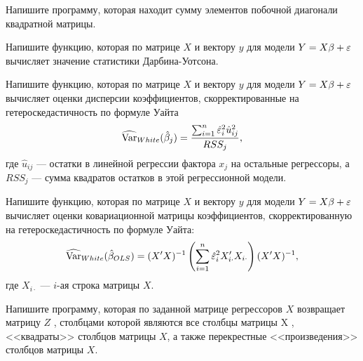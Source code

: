 \documentclass[pdftex,11pt,openany]{book}\usepackage[]{graphicx}\usepackage[]{color}
\begin{document}
\begin{solution}
\end{solution}


\begin{problem}
Напишите программу, которая находит сумму элементов побочной диагонали квадратной матрицы. 
\end{problem}

\begin{solution}
\end{solution}


\begin{problem}
Напишите функцию, которая по матрице $X$ и вектору $y$ для модели $Y=X\beta+\varepsilon$ вычисляет значение статистики Дарбина-Уотсона.
\end{problem}

\begin{solution}
\end{solution}

\begin{problem}
Напишите функцию, которая по матрице $X$ и вектору $y$ для модели $Y=X\beta+\varepsilon$ вычисляет оценки дисперсии коэффициентов, скорректированные на гетероскедастичность по формуле Уайта 
\[
\widehat{\operatorname{Var}}_{White}(\hat{\beta}_j)=\frac{\sum_{i=1}^{n}\hat{\varepsilon}_i^2\hat{u}_{ij}^2}{RSS_j},
\]
где $\hat{u}_{ij}$ --- остатки в линейной регрессии фактора $x_j$ на остальные регрессоры, а $RSS_j$ --- сумма квадратов остатков в этой регрессионной модели.
\end{problem}

\begin{solution}
\end{solution}


\begin{problem}
Напишите функцию, которая по матрице $X$ и вектору $y$ для модели $Y=X\beta+\varepsilon$ вычисляет оценки ковариационной матрицы коэффициентов, скорректированную на гетероскедастичность по формуле Уайта: 
\[
\widehat{\operatorname{Var}}_{White}(\hat{\beta}_{OLS})=(X'X)^{-1} \left( \sum_{i=1}^n \hat{\varepsilon}_i^2 X_{i\cdot}'X_{i\cdot} \right) (X'X)^{-1},
\] 
где $X_{i\cdot}$ --- $i$-ая строка матрицы $X$.
\end{problem}

\begin{solution}
\end{solution}

\begin{problem}
Напишите программу, которая по заданной матрице регрессоров $X$
возвращает матрицу $Z$ , столбцами которой являются все столбцы матрицы X ,
<<квадраты>> столбцов матрицы $X$, а также перекрестные <<произведения>> столбцов
матрицы $X$.
\end{problem}
\end{document}
